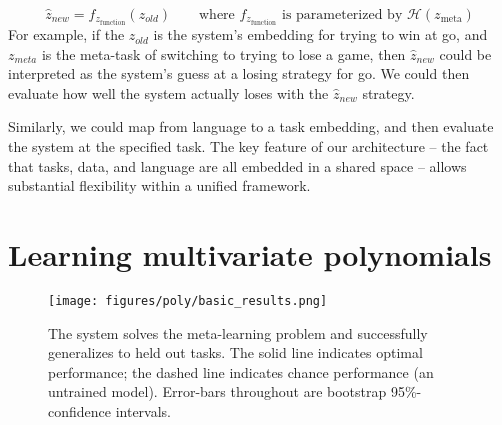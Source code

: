 \documentclass{article}
\begin{document}
\[\hat{z}_{new} = f_{z_{\text{function}}}(z_{old}) \qquad \text{where } f_{z_{\text{function}}} \text{ is parameterized by } \mathcal{H}\left(z_{\text{meta}}\right)\]
For example, if the $z_{old}$ is the system's embedding for trying to win at go, and $z_{meta}$ is the meta-task of switching to trying to lose a game, then $\hat{z}_{new}$ could be interpreted as the system's guess at a losing strategy for go. We could then evaluate how well the system actually loses with the $\hat{z}_{new}$ strategy. \par
Similarly, we could map from language to a task embedding, and then evaluate the system at the specified task. The key feature of our architecture -- the fact that tasks, data, and language are all embedded in a shared space -- allows substantial flexibility within a unified framework. 

%
\section{Learning multivariate polynomials}
\begin{figure}
\centering
\texttt{[image: figures/poly/basic\_results.png]}
\caption{The system solves the meta-learning problem and successfully generalizes to held out tasks. The solid line indicates optimal performance; the dashed line indicates chance performance (an untrained model). Error-bars throughout are bootstrap 95\%-confidence intervals.}
\label{poly_basic_results}
\end{figure}
\end{document}
